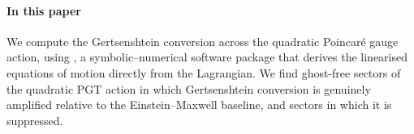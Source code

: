 \paragraph*{In this paper}
We compute the Gertsenshtein conversion across the quadratic
Poincar\'e gauge action, using \textit{\TIDAL{}}, a
symbolic--numerical software package that derives the linearised
equations of motion directly from the Lagrangian.
We find ghost-free sectors of the quadratic PGT action in which
Gertsenshtein conversion is genuinely amplified relative to the
Einstein--Maxwell baseline, and sectors in which it is suppressed.

